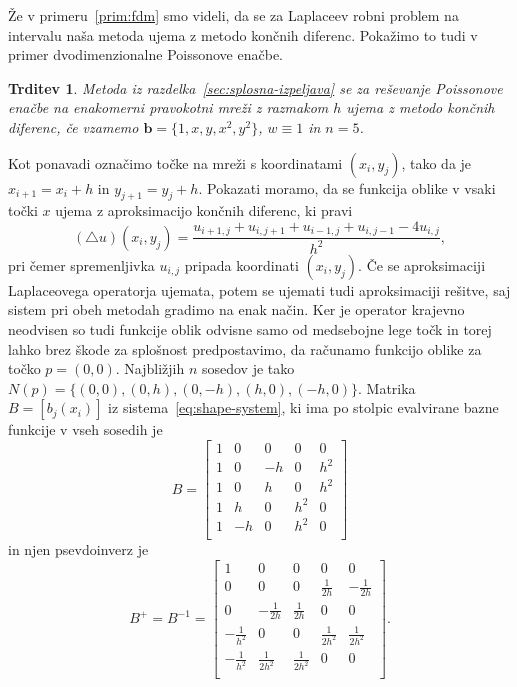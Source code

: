 \documentclass[12pt,a4paper]{article}
\theoremstyle{definition} %
\theoremstyle{plain} %
\newtheorem{trditev}[definicija]{Trditev}
\numberwithin{equation}{section}
\renewcommand{\b}{\boldsymbol}
\begin{document}
Že v primeru~\ref{prim:fdm} smo videli, da se za Laplaceev robni problem na
intervalu naša metoda ujema z metodo končnih diferenc. Pokažimo to tudi v
primer dvodimenzionalne Poissonove enačbe.

\begin{trditev}
  \label{trd:eq-to-fdm}
  Metoda iz razdelka~\ref{sec:splosna-izpeljava} se za reševanje Poissonove
  enačbe na enakomerni pravokotni mreži z razmakom $h$ ujema z metodo končnih
  diferenc, če vzamemo $\b{b} = \{1, x, y, x^2, y^2\}$, $w \equiv 1$ in
  $n=5$.
\end{trditev}
\proof
Kot ponavadi označimo točke na mreži s koordinatami $(x_i, y_j)$, tako da je
$x_{i+1} = x_i + h$ in $y_{j+1} = y_j + h$.
Pokazati moramo, da se funkcija oblike v vsaki točki $x$ ujema z aproksimacijo
končnih diferenc,
ki pravi
\[
  (\triangle u)(x_i, y_j) = \frac{u_{i+1,j} + u_{i, j+1} + u_{i-1,j} + u_{i, j-1} -
  4u_{i,j}}{h^2},
\]
pri čemer spremenljivka $u_{i, j}$ pripada koordinati $(x_i, y_j)$. Če se
aproksimaciji Laplaceovega operatorja ujemata, potem se ujemati tudi
aproksimaciji rešitve, saj sistem pri obeh metodah gradimo na enak način.
Ker je operator krajevno neodvisen so tudi funkcije oblik odvisne samo od
medsebojne lege točk in torej lahko brez škode
za splošnost predpostavimo, da računamo funkcijo oblike za točko
$p = (0, 0)$. Najbližjih $n$ sosedov je tako $N(p) = \{(0, 0), (0, h), (0, -h),
(h, 0), (-h, 0)\}$. Matrika $B = [b_j(x_i)]$ iz sistema~\eqref{eq:shape-system},
ki ima po stolpic evalvirane bazne funkcije v vseh sosedih je
\[
  B =
  \begin{bmatrix}
    1 & 0 & 0 & 0 & 0 \\
    1 & 0 & -h & 0 & h^2 \\
    1 & 0 & h & 0 & h^2 \\
    1 & h & 0 & h^2 & 0 \\
    1 & -h & 0 & h^2 & 0 \\
  \end{bmatrix}
\]
in njen psevdoinverz je
\[
  B^+ = B^{-1} =
  \begin{bmatrix}
     1 & 0 & 0 & 0 & 0 \\
 0 & 0 & 0 & \frac{1}{2 h} & -\frac{1}{2 h} \\
 0 & -\frac{1}{2 h} & \frac{1}{2 h} & 0 & 0 \\
 -\frac{1}{h^2} & 0 & 0 & \frac{1}{2 h^2} & \frac{1}{2 h^2} \\
 -\frac{1}{h^2} & \frac{1}{2 h^2} & \frac{1}{2 h^2} & 0 & 0 \\
  \end{bmatrix}.
\]
\end{document}
